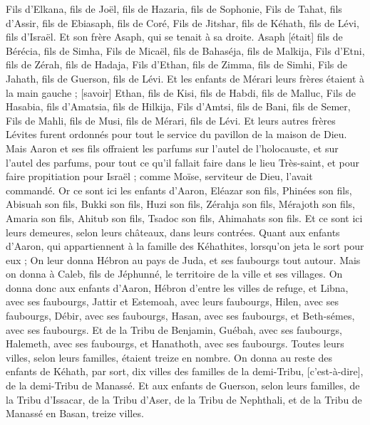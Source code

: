 \begin{multicols}{2}
Fils d'Elkana, fils de Joël, fils de Hazaria, fils de Sophonie,
Fils de Tahat, fils d'Assir, fils de Ebiasaph, fils de Coré,
Fils de Jitshar, fils de Kéhath, fils de Lévi, fils d'Israël.
Et son frère Asaph, qui se tenait à sa droite. Asaph [était] fils de Bérécia, fils de Simha,
Fils de Micaël, fils de Bahaséja, fils de Malkija,
Fils d'Etni, fils de Zérah, fils de Hadaja,
Fils d'Ethan, fils de Zimma, fils de Simhi,
Fils de Jahath, fils de Guerson, fils de Lévi.
Et les enfants de Mérari leurs frères étaient à la main gauche ; [savoir] Ethan, fils de Kisi, fils de Habdi, fils de Malluc,
Fils de Hasabia, fils d'Amatsia, fils de Hilkija,
Fils d'Amtsi, fils de Bani, fils de Semer,
Fils de Mahli, fils de Musi, fils de Mérari, fils de Lévi.
Et leurs autres frères Lévites furent ordonnés pour tout le service du pavillon de la maison de Dieu.
Mais Aaron et ses fils offraient les parfums sur l'autel de l'holocauste, et sur l'autel des parfums, pour tout ce qu'il fallait faire dans le lieu Très-saint, et pour faire propitiation pour Israël ; comme Moïse, serviteur de Dieu, l'avait commandé.
Or ce sont ici les enfants d'Aaron, Eléazar son fils, Phinées son fils, Abisuah son fils,
Bukki son fils, Huzi son fils, Zérahja son fils,
Mérajoth son fils, Amaria son fils, Ahitub son fils,
Tsadoc son fils, Ahimahats son fils.
Et ce sont ici leurs demeures, selon leurs châteaux, dans leurs contrées. Quant aux enfants d'Aaron, qui appartiennent à la famille des Kéhathites, lorsqu'on jeta le sort pour eux ;
On leur donna Hébron au pays de Juda, et ses faubourgs tout autour.
Mais on donna à Caleb, fils de Jéphunné, le territoire de la ville et ses villages.
On donna donc aux enfants d'Aaron, Hébron d'entre les villes de refuge, et Libna, avec ses faubourgs, Jattir et Estemoah, avec leurs faubourgs,
Hilen, avec ses faubourgs, Débir, avec ses faubourgs,
Hasan, avec ses faubourgs, et Beth-sémes, avec ses faubourgs.
Et de la Tribu de Benjamin, Guébah, avec ses faubourgs, Halemeth, avec ses faubourgs, et Hanathoth, avec ses faubourgs. Toutes leurs villes, selon leurs familles, étaient treize en nombre.
On donna au reste des enfants de Kéhath, par sort, dix villes des familles de la demi-Tribu, [c'est-à-dire], de la demi-Tribu de Manassé.
Et aux enfants de Guerson, selon leurs familles, de la Tribu d'Issacar, de la Tribu d'Aser, de la Tribu de Nephthali, et de la Tribu de Manassé en Basan, treize villes.

\end{multicols}
